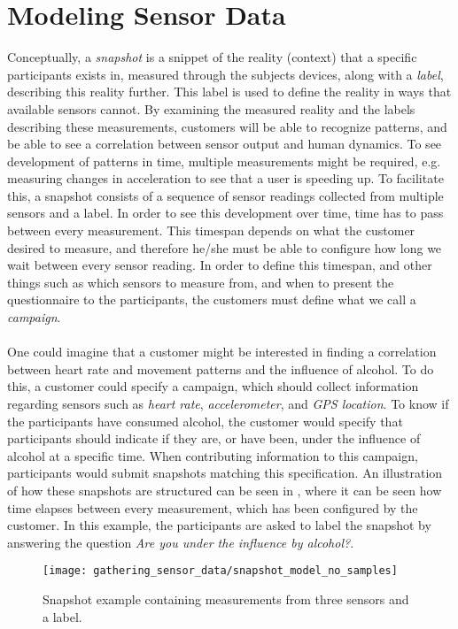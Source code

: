 
\section{Modeling Sensor Data}
\label{sec:modeling_sensor_data}

Conceptually, a \emph{snapshot} is a snippet of the reality (context) that a specific participants exists in, measured through the subjects devices, along with a \emph{label}, describing this reality further. This label is used to define the reality in ways that available sensors cannot. By examining the measured reality and the labels describing these measurements, customers will be able to recognize patterns, and be able to see a correlation between sensor output and human dynamics. To see development of patterns in time, multiple measurements might be required, e.g. measuring changes in acceleration to see that a user is speeding up. To facilitate this, a snapshot consists of a sequence of sensor readings collected from multiple sensors and a label. In order to see this development over time, time has to pass between every measurement. This timespan depends on what the customer desired to measure, and therefore he/she must be able to configure how long we wait between every sensor reading. In order to define this timespan, and other things such as which sensors to measure from, and when to present the questionnaire to the participants, the customers must define what we call a \emph{campaign}.
\\\\
One could imagine that a customer might be interested in finding a correlation between heart rate and movement patterns and the influence of alcohol. To do this, a customer could specify a campaign, which should collect information regarding sensors such as \emph{heart rate}, \emph{accelerometer}, and \emph{GPS location}. To know if the participants have consumed alcohol, the customer would specify that participants should indicate if they are, or have been, under the influence of alcohol at a specific time. When contributing information to this campaign, participants would submit snapshots matching this specification. An illustration of how these snapshots are structured can be seen in , where it can be seen how time elapses between every measurement, which has been configured by the customer. In this example, the participants are asked to label the snapshot by answering the question \emph{Are you under the influence by alcohol?}.
\\
\begin{figure}[!htbp]
    \centering
    \texttt{[image: gathering\_sensor\_data/snapshot\_model\_no\_samples]}
    \caption{Snapshot example containing measurements from three sensors and a label.}
    \label{fig:snapshot_model_no_samples}
\end{figure}
\FloatBarrier


